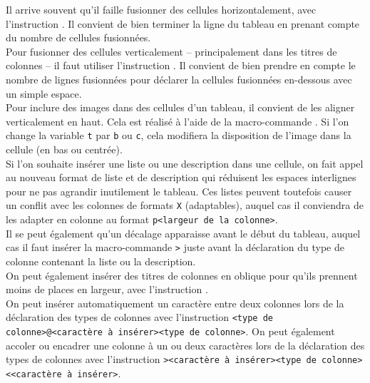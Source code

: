 \documentclass[a4paper, 11pt, twoside, fleqn]{memoir}
\begin{document}
Il arrive souvent qu'il faille fusionner des cellules horizontalement, avec l'instruction \texttt{}. Il convient de bien terminer la ligne du tableau en prenant compte du nombre de cellules fusionnées.\\
Pour fusionner des cellules verticalement -- principalement dans les titres de colonnes -- il faut utiliser l'instruction \texttt{}. Il convient de bien prendre en compte le nombre de lignes fusionnées pour déclarer la cellules fusionnées en-dessous avec un simple espace.\\
	
	Pour inclure des images dans des cellules d'un tableau, il convient de les aligner verticalement en haut. Cela est réalisé à l'aide de la macro-commande \texttt{}. Si l'on change la variable \texttt{t} par \texttt{b} ou \texttt{c}, cela modifiera la disposition de l'image dans la cellule (en bas ou centrée).\\
	
	Si l'on souhaite insérer une liste ou une description dans une cellule, on fait appel au nouveau format de liste \texttt{\tabitemize} et de description \texttt{\tabdescription} qui réduisent les espaces interlignes pour ne pas agrandir inutilement le tableau. Ces listes peuvent toutefois causer un conflit avec les colonnes de formats \texttt{X} (adaptables), auquel cas il conviendra de les adapter en colonne au format \texttt{p{<largeur de la colonne>}}.\\
Il se peut également qu'un décalage apparaisse avant le début du tableau, auquel cas il faut insérer la macro-commande \texttt{>{\compress}} juste avant la déclaration du type de colonne contenant la liste ou la description.\\

On peut également insérer des titres de colonnes en oblique pour qu'ils prennent moins de places en largeur, avec l'instruction \texttt{}.\\

On peut insérer automatiquement un caractère entre deux colonnes lors de la déclaration des types de colonnes avec l'instruction \texttt{<type de colonne>@{<caractère à insérer>}<type de colonne>}. On peut également accoler ou encadrer une colonne à un ou deux caractères lors de la déclaration des types de colonnes avec l'instruction \texttt{>{<caractère à insérer>}<type de colonne><{<caractère à insérer>}}.\\
\end{document}
